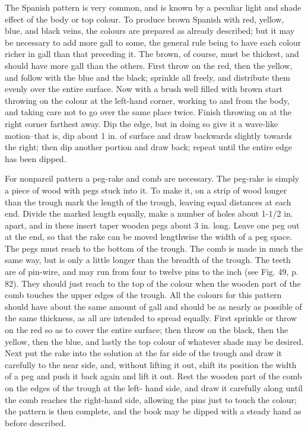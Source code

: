 \documentclass[twoside]{book}
\begin{document}
The Spanish pattern is very common, and is
known by a peculiar light and shade effect of the
body or top colour. To produce brown Spanish
\pagebreak
with red, yellow, blue, and black veins, the colours
are prepared as already described; but it may be
necessary to add more gall to some, the general rule
being to have each colour richer in gall than that
preceding it. The brown, of course, must be thickest,
and should have more gall than the others.
First throw on the red, then the yellow, and follow
with the blue and the black; sprinkle all freely, and
distribute them evenly over the entire surface. Now
with a brush well filled with brown start throwing
on the colour at the left-hand corner, working to
and from the body, and taking care not to go over
the same place twice. Finish throwing on at the
right corner farthest away. Dip the edge, but in
doing so give it a wave-like motion--that is, dip
about 1 in. of surface and draw backwards slightly
towards the right; then dip another portion and
draw back; repeat until the entire edge has been
dipped.

For nonpareil pattern a peg-rake and comb are
necessary. The peg-rake is simply a piece of wood
with pegs stuck into it. To make it, on a strip of
wood longer than the trough mark the length of
the trough, leaving equal distances at each end.
Divide the marked length equally, make a number
of holes about 1-1/2 in. apart, and in these insert
taper wooden pegs about 3 in. long. Leave one
peg out at the end, so that the rake can be moved
lengthwise the width of a peg space. The pegs
must reach to the bottom of the trough. The comb
is made in much the same way, but is only a little
longer than the breadth of the trough. The teeth
are of pin-wire, and may run from four to twelve
pins to the inch (see Fig. 49, p. 82). They should
just reach to the top of the colour when the wooden
part of the comb touches the upper edges of the
trough. All the colours for this pattern should have
about the same amount of gall and should be as
nearly as possible of the same thickness, as all are
\pagebreak
intended to spread equally. First sprinkle or throw
on the red so as to cover the entire surface; then
throw on the black, then the yellow, then the blue,
and lastly the top colour of whatever shade may be
desired. Next put the rake into the solution at the
far side of the trough and draw it carefully to the
near side, and, without lifting it out, shift its
position the width of a peg and push it back again
and lift it out. Rest the wooden part of the comb
on the edges of the trough at the left- hand side, and
draw it carefully along until the comb reaches the
right-hand side, allowing the pins just to touch the
colour; the pattern is then complete, and the book
may be dipped with a steady hand as before described.
\end{document}
